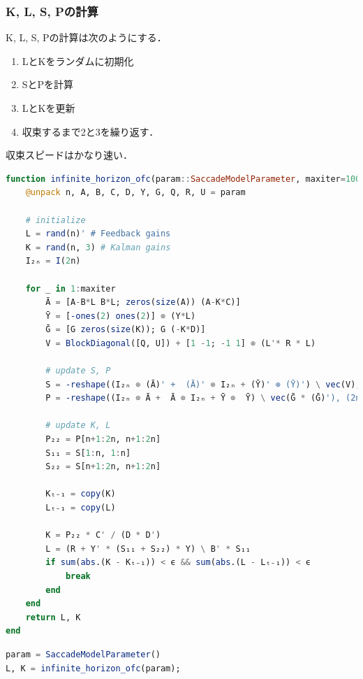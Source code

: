 \subsubsection{K, L, S, Pの計算}
K, L, S, Pの計算は次のようにする．
\begin{enumerate}
\item LとKをランダムに初期化
\item SとPを計算
\item LとKを更新
\item 収束するまで2と3を繰り返す．
\end{enumerate}
収束スピードはかなり速い．
\begin{lstlisting}[language=julia]
function infinite_horizon_ofc(param::SaccadeModelParameter, maxiter=1000, ϵ=1e-8)
    @unpack n, A, B, C, D, Y, G, Q, R, U = param
    
    # initialize
    L = rand(n)' # Feedback gains
    K = rand(n, 3) # Kalman gains
    I₂ₙ = I(2n)

    for _ in 1:maxiter
        Ā = [A-B*L B*L; zeros(size(A)) (A-K*C)]
        Ȳ = [-ones(2) ones(2)] ⊗ (Y*L) 
        Ḡ = [G zeros(size(K)); G (-K*D)]
        V = BlockDiagonal([Q, U]) + [1 -1; -1 1] ⊗ (L'* R * L)

        # update S, P
        S = -reshape((I₂ₙ ⊗ (Ā)' +  (Ā)' ⊗ I₂ₙ + (Ȳ)' ⊗ (Ȳ)') \ vec(V), (2n, 2n))
        P = -reshape((I₂ₙ ⊗ Ā +  Ā ⊗ I₂ₙ + Ȳ ⊗  Ȳ) \ vec(Ḡ * (Ḡ)'), (2n, 2n))

        # update K, L
        P₂₂ = P[n+1:2n, n+1:2n]
        S₁₁ = S[1:n, 1:n]
        S₂₂ = S[n+1:2n, n+1:2n]

        Kₜ₋₁ = copy(K)
        Lₜ₋₁ = copy(L)

        K = P₂₂ * C' / (D * D')
        L = (R + Y' * (S₁₁ + S₂₂) * Y) \ B' * S₁₁
        if sum(abs.(K - Kₜ₋₁)) < ϵ && sum(abs.(L - Lₜ₋₁)) < ϵ
            break
        end
    end
    return L, K
end
\end{lstlisting}
\begin{lstlisting}[language=julia]
param = SaccadeModelParameter()
L, K = infinite_horizon_ofc(param);
\end{lstlisting}

